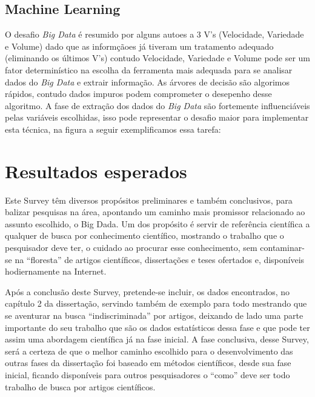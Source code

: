 \documentclass[conference,compsoc]{IEEEtran}
\begin{document}
\subsection{Machine Learning}\label{arte:palavraChave:Machine}

O desafio \textit{Big Data} é resumido por alguns autoes a 3 V's (Velocidade, Variedade e Volume) dado que as informçãoes já tiveram um tratamento adequado (eliminando os últimos V's) contudo Velocidade, Variedade e Volume pode ser um fator determinístico na escolha da ferramenta mais adequada para se analisar dados do \textit{Big Data} e extrair informação. As árvores de decisão são algorimos rápidos, contudo dados impuros podem comprometer o desepenho desse algoritmo. A fase de extração dos dados do \textit{Big Data} são fortemente influenciáveis pelas variáveis escolhidas, \cite{DecisionTree} isso pode representar o desafio maior para implementar esta técnica, na figura a seguir exemplificamos essa tarefa:








\section{Resultados esperados}

Este Survey têm diversos propósitos preliminares e também conclusivos, para balizar pesquisas na área, apontando um caminho mais promissor relacionado ao assunto escolhido, o Big Dada. Um dos propósito é servir de referência científica a qualquer de busca por conhecimento científico, mostrando o trabalho que o pesquisador deve ter, o cuidado ao procurar 
esse conhecimento, sem contaminar-se na ``floresta'' de artigos científicos, dissertações e teses ofertados e, disponíveis hodiernamente na Internet. 

Após a conclusão deste Survey, pretende-se incluir, os dados encontrados, no capítulo 2 da dissertação, servindo também de exemplo para todo mestrando que se aventurar na busca “indiscriminada” por artigos, deixando de lado uma parte importante do seu trabalho que são os dados estatísticos dessa fase e que pode ter assim uma abordagem científica já na fase inicial.
A fase conclusiva, desse Survey, será a certeza de que o melhor caminho escolhido para o desenvolvimento das outras fases da dissertação foi baseado em métodos científicos, desde sua fase inicial, ficando disponíveis para outros pesquisadores o ``como'' deve ser todo trabalho de busca por artigos científicos.
\end{document}
